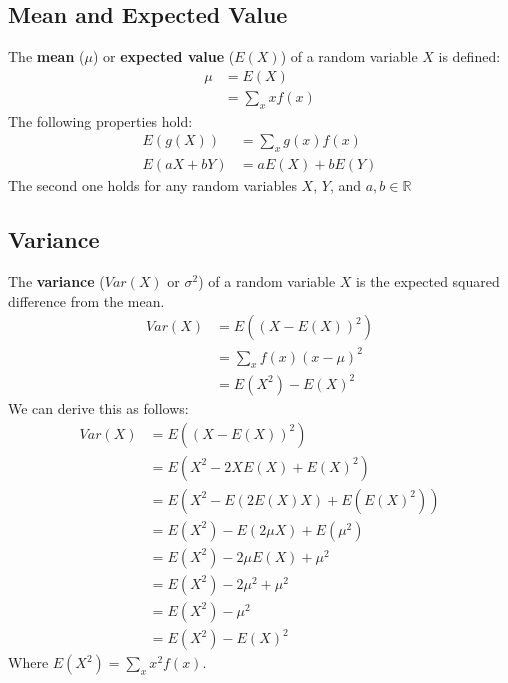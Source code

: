                 \subsection{Mean and Expected Value} %
                \label{sub:mean_and_expected_value}
                    The \textbf{mean} ($\mu$) or \textbf{expected value} ($E(X)$) of a random variable $X$ is defined:
                    \begin{align*}
                        \mu &= E(X) \\
                        &= \sum_x xf(x)
                    \end{align*}
                    The following properties hold:
                    \begin{align*}
                        E(g(X)) &= \sum_x g(x)f(x) \\
                        E(aX + bY) &= aE(X) + bE(Y)
                    \end{align*}
                    The second one holds for any random variables $X$, $Y$, and $a, b \in \mathbb{R}$
                \subsection{Variance} %
                \label{sub:variance}
                    The \textbf{variance} ($Var(X)$ or $\sigma^2$) of a random variable $X$ is the expected squared difference from the mean.
                    \begin{align*}
                        Var(X) &= E((X - E(X))^2) \\
                        &= \sum_x f(x)(x - \mu)^2 \\
                        &= E(X^2) - E(X)^2
                    \end{align*}
                    We can derive this as follows:
                    \begin{align*}
                        Var(X) &= E\left( (X - E(X))^2 \right) \\
                        &= E ( X^2 - 2XE(X) + E(X)^2) \\
                        &= E(X^2 - E(2E(X)X) + E(E(X)^2)) \\
                        &= E(X^2) - E(2 \mu X) + E(\mu^2) \\
                        &= E(X^2) - 2 \mu E(X) + \mu^2 \\
                        &= E(X^2) - 2\mu^2 + \mu^2 \\
                        &= E(X^2) - \mu^2 \\
                        &= E(X^2) - E(X)^2
                    \end{align*}
                    Where $E(X^2) = \sum_x x^2 f(x)$.


